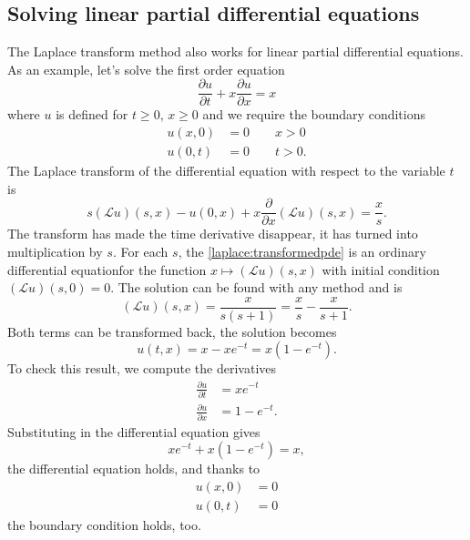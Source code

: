 \subsection{Solving linear partial differential equations}
The Laplace transform method also works for linear partial differential
equations.
As an example, let's solve the first order equation
\[
\frac{\partial u}{\partial t}+x\frac{\partial u}{\partial x}=x
\]
where $u$ is defined for $t\ge 0$, $x\ge 0$ and we require the
boundary conditions
\begin{align*}
u(x,0)&=0\qquad x>0\\
u(0,t)&=0\qquad t>0.
\end{align*}
The Laplace transform of the differential equation with respect to
the variable $t$ is
\begin{equation}
s(\mathscr{L}u)(s,x)-u(0,x)+x\frac{\partial}{\partial x}(\mathscr{L}u)(s,x)
=
\frac{x}{s}.
\label{laplace:transformedpde}
\end{equation}
The transform has made the time derivative disappear, it has
turned into multiplication by $s$.
For each $s$, the \eqref{laplace:transformedpde} is an ordinary
differential equationfor the function $x\mapsto (\mathscr{L}u)(s,x)$
with initial condition
$(\mathscr{L}u)(s,0)=0$.
The solution can be found with any method and is
\[
(\mathscr{L}u)(s,x)=\frac{x}{s(s+1)}=\frac{x}{s}-\frac{x}{s+1}.
\]
Both terms can be transformed back, the solution becomes
\[
u(t,x)=x-xe^{-t}=x(1-e^{-t}).
\]
To check this result, we compute the derivatives
\begin{align*}
\frac{\partial u}{\partial t}
&=
xe^{-t}
\\
\frac{\partial u}{\partial x}
&=
1-e^{-t}.
\end{align*}
Substituting in the differential equation gives
\[
xe^{-t}+x(1-e^{-t})=x,
\]
the differential equation holds, and thanks to
\begin{align*}
u(x,0)
&=
0
\\
u(0,t)
&=
0
\end{align*}
the boundary condition holds, too.

